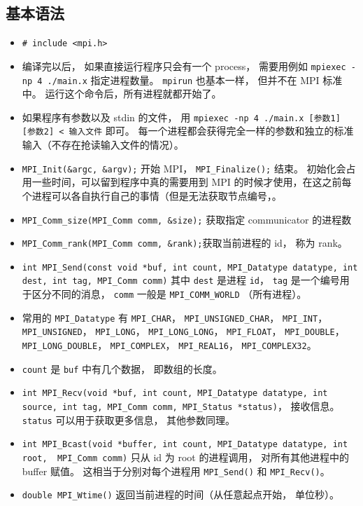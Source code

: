 \subsection{基本语法}
\begin{itemize}
\item \verb|# include <mpi.h>|
\item 编译完以后， 如果直接运行程序只会有一个 process， 需要用例如 \verb|mpiexec -np 4 ./main.x| 指定进程数量。 \verb|mpirun| 也基本一样， 但并不在 MPI 标准中。 运行这个命令后，所有进程就都开始了。
\item 如果程序有参数以及 stdin 的文件， 用 \verb`mpiexec -np 4 ./main.x [参数1] [参数2] < 输入文件` 即可。 每一个进程都会获得完全一样的参数和独立的标准输入（不存在抢读输入文件的情况）。
\item \verb|MPI_Init(&argc, &argv);| 开始 MPI， \verb|MPI_Finalize();| 结束。 初始化会占用一些时间，可以留到程序中真的需要用到 MPI 的时候才使用，在这之前每个进程可以各自执行自己的事情（但是无法获取节点编号，。
\item \verb|MPI_Comm_size(MPI_Comm comm, &size);| 获取指定 communicator 的进程数
\item \verb|MPI_Comm_rank(MPI_Comm comm, &rank);|获取当前进程的 id， 称为 rank。
\item \verb|int MPI_Send(const void *buf, int count, MPI_Datatype datatype, int dest, int tag, MPI_Comm comm)| 其中 \verb|dest| 是进程 \verb|id|， \verb|tag| 是一个编号用于区分不同的消息， \verb|comm| 一般是 \verb|MPI_COMM_WORLD| （所有进程）。
\item 常用的 \verb|MPI_Datatype| 有 \verb|MPI_CHAR|， \verb|MPI_UNSIGNED_CHAR|， \verb|MPI_INT|， \verb|MPI_UNSIGNED|， \verb|MPI_LONG|， \verb|MPI_LONG_LONG|， \verb|MPI_FLOAT|， \verb|MPI_DOUBLE|， \verb|MPI_LONG_DOUBLE|， \verb|MPI_COMPLEX|， \verb|MPI_REAL16|， \verb|MPI_COMPLEX32|。
\item \verb|count| 是 \verb|buf| 中有几个数据， 即数组的长度。
\item \verb|int MPI_Recv(void *buf, int count, MPI_Datatype datatype, int source, int tag, MPI_Comm comm, MPI_Status *status)|， 接收信息。 \verb|status| 可以用于获取更多信息， 其他参数同理。
\item \verb|int MPI_Bcast(void *buffer, int count, MPI_Datatype datatype, int root,  MPI_Comm comm)| 只从 id 为 root 的进程调用， 对所有其他进程中的 buffer 赋值。 这相当于分别对每个进程用 \verb|MPI_Send()| 和 \verb|MPI_Recv()|。
\item \verb|double MPI_Wtime()| 返回当前进程的时间（从任意起点开始， 单位秒）。

\end{itemize}
